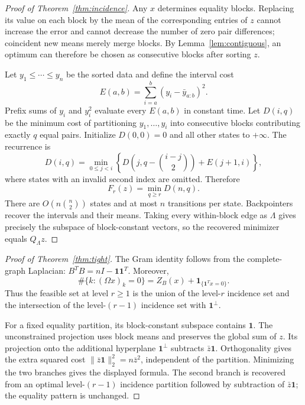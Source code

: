 \documentclass[11pt]{article}
\newcommand{\one}{\mathbf{1}}
\begin{document}
\begin{proof}[Proof of Theorem~\ref{thm:incidence}]
Any $x$ determines equality blocks. Replacing its value on each block by the
mean of the corresponding entries of $z$ cannot increase the error and cannot
decrease the number of zero pair differences; coincident new means merely
merge blocks. By Lemma~\ref{lem:contiguous}, an optimum can therefore be
chosen as consecutive blocks after sorting $z$.

Let $y_1\le\cdots\le y_n$ be the sorted data and define the interval cost
\[
 E(a,b)=\sum_{i=a}^b(y_i-\bar y_{a:b})^2.
\]
Prefix sums of $y_i$ and $y_i^2$ evaluate every $E(a,b)$ in constant time.
Let $D(i,q)$ be the minimum cost of partitioning $y_1,\ldots,y_i$ into
consecutive blocks contributing exactly $q$ equal pairs. Initialize
$D(0,0)=0$ and all other states to $+\infty$. The recurrence is
\[
 D(i,q)=\min_{0\le j<i}\left\{
 D\!\left(j,q-\binom{i-j}{2}\right)+E(j+1,i)
 \right\},
\]
where states with an invalid second index are omitted. Therefore
\[
 F_r(z)=\min_{q\ge r}D(n,q).
\]
There are $O(n\binom n2)$ states and at most $n$ transitions per state.
Backpointers recover the intervals and their means. Taking every within-block
edge as $\Lambda$ gives precisely the subspace of block-constant vectors, so
the recovered minimizer equals $Q_\Lambda z$.
\end{proof}

\begin{proof}[Proof of Theorem~\ref{thm:tight}]
The Gram identity follows from the complete-graph Laplacian:
$B^TB=nI-\one\one^T$. Moreover,
\[
 \#\{k:(\Omega x)_k=0\}=Z_B(x)+\mathbf 1_{\{\one^Tx=0\}}.
\]
Thus the feasible set at level $r\ge1$ is the union of the level-$r$
incidence set and the intersection of the level-$(r-1)$ incidence set with
$\one^\perp$.

For a fixed equality partition, its block-constant subspace contains
$\one$. The unconstrained projection uses block means and preserves the
global sum of $z$. Its projection onto the additional hyperplane
$\one^\perp$ subtracts $\bar z\one$. Orthogonality gives the extra squared
cost $\|\bar z\one\|_2^2=n\bar z^2$, independent of the partition. Minimizing
the two branches gives the displayed formula. The second branch is recovered
from an optimal level-$(r-1)$ incidence partition followed by subtraction of
$\bar z\one$; the equality pattern is unchanged.
\end{proof}
\end{document}
